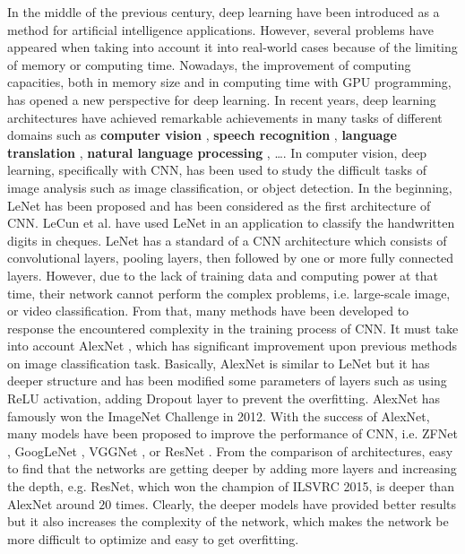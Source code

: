 \documentclass[review]{elsarticle}
\begin{document}
In the middle of the previous century, deep learning \cite{lecun2015deep} have been introduced as a method for artificial intelligence applications. However, several problems have appeared when taking into account it into real-world cases because of the limiting of memory or computing time. Nowadays, the improvement of computing capacities, both in memory size and in computing time with GPU programming, has opened a new perspective for deep learning. In recent years, deep learning architectures have achieved remarkable achievements in many tasks of different domains such as \textbf{computer vision} \cite{lecun1998gradient, krizhevsky2012imagenet,  szegedy2015going,farabet2013learning,li2015convolutional}, \textbf{speech recognition} \cite{mikolov2011strategies, hinton2012deep}, \textbf{language translation} \cite{jean2014using, sutskever2014sequence}, \textbf{natural language processing} \cite{lecun2015deep, collobert2011natural, collobert2008unified}, \ldots. In computer vision, deep learning, specifically with CNN, has been used to study the difficult tasks of image analysis such as image classification, or object detection. In the beginning, LeNet \cite{lecun1998gradient} has been proposed and has been considered as the first architecture of CNN. LeCun et al. \cite{lecun1998gradient} have used LeNet in an application to classify the handwritten digits in cheques. LeNet has a standard of a CNN architecture which consists of convolutional layers, pooling layers, then followed by one or more fully connected layers. However, due to the lack of training data and computing power at that time, their network cannot perform the complex problems, i.e. large-scale image, or video classification. From that, many methods have been developed to response the encountered complexity in the training process of CNN. It must take into account AlexNet \cite{krizhevsky2012imagenet}, which has significant improvement upon previous methods on image classification task. Basically, AlexNet \cite{krizhevsky2012imagenet} is similar to LeNet \cite{lecun1998gradient} but it has deeper structure and has been modified some parameters of layers such as using ReLU activation, adding Dropout layer to prevent the overfitting. AlexNet has famously won the ImageNet Challenge \cite{krizhevsky2012imagenet} in 2012. With the success of AlexNet, many models have been proposed to improve the performance of CNN, i.e. ZFNet  \cite{zeiler2014visualizing}, GoogLeNet \cite{szegedy2015going}, VGGNet \cite{simonyan2014very}, or ResNet \cite{he2016deep}. From the comparison of architectures, easy to find that the networks are getting deeper by adding more layers and increasing the depth, e.g. ResNet, which won the champion of ILSVRC 2015, is deeper than AlexNet around $20$ times. Clearly, the deeper models have provided better results but it also increases the complexity of the network, which makes the network be more difficult to optimize and easy to get overfitting.
\end{document}
